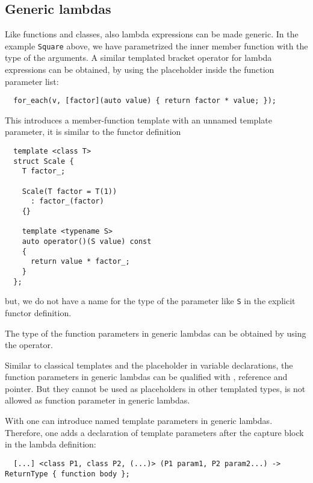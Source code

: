 \subsection{Generic lambdas}
Like functions and classes, also lambda expressions can be made generic. In the example \texttt{Square} above, we have parametrized the
inner member function  with the type of the arguments. A similar templated bracket operator for lambda expressions
can be obtained, by using the placeholder  inside the function parameter list:
%
\begin{verbatim}
  for_each(v, [factor](auto value) { return factor * value; });
\end{verbatim}
%
This introduces a member-function template with an unnamed template parameter, \ie it is similar to the functor definition
%
\begin{verbatim}
  template <class T>
  struct Scale {
    T factor_;

    Scale(T factor = T(1))
      : factor_(factor)
    {}

    template <typename S>
    auto operator()(S value) const
    {
      return value * factor_;
    }
  };
\end{verbatim}
%
but, we do not have a name for the type of the parameter like \texttt{S} in the explicit functor definition.

\begin{rem}
  The type of the function parameters in generic lambdas can be obtained by using the  operator.
\end{rem}

Similar to classical templates and the  placeholder in variable declarations, the function parameters in generic lambdas
can be qualified with , reference and pointer. But they cannot be used as placeholders in other templated types, \eg
{} is not allowed as function parameter in generic lambdas.

\begin{rem}
  With \marginpar{[\cxx{20}]} one can introduce named template parameters in generic lambdas. Therefore, one adds a declaration
  of template parameters after the capture block in the lambda definition:
  \begin{verbatim}
  [...] <class P1, class P2, (...)> (P1 param1, P2 param2...) -> ReturnType { function body };
  \end{verbatim}
\end{rem}


